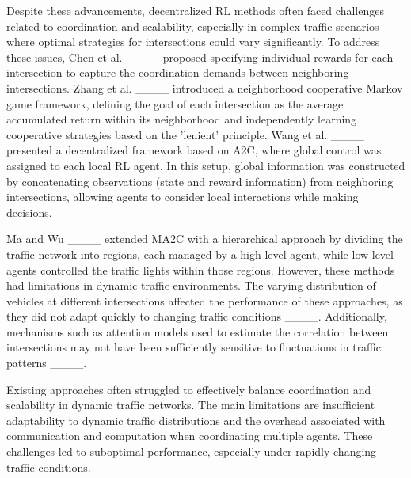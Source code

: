 Despite these advancements, decentralized RL methods often faced challenges related to coordination and scalability, especially in complex traffic scenarios where optimal strategies for intersections could vary significantly. To address these issues, Chen et al. ____ proposed specifying individual rewards for each intersection to capture the coordination demands between neighboring intersections. Zhang et al. ____ introduced a neighborhood cooperative Markov game framework, defining the goal of each intersection as the average accumulated return within its neighborhood and independently learning cooperative strategies based on the 'lenient' principle. Wang et al. ____ presented a decentralized framework based on A2C, where global control was assigned to each local RL agent. In this setup, global information was constructed by concatenating observations (state and reward information) from neighboring intersections, allowing agents to consider local interactions while making decisions.

Ma and Wu ____ extended MA2C with a hierarchical approach by dividing the traffic network into regions, each managed by a high-level agent, while low-level agents controlled the traffic lights within those regions. However, these methods had limitations in dynamic traffic environments. The varying distribution of vehicles at different intersections affected the performance of these approaches, as they did not adapt quickly to changing traffic conditions ____. Additionally, mechanisms such as attention models used to estimate the correlation between intersections may not have been sufficiently sensitive to fluctuations in traffic patterns ____.

Existing approaches often struggled to effectively balance coordination and scalability in dynamic traffic networks. The main limitations are insufficient adaptability to dynamic traffic distributions and the overhead associated with communication and computation when coordinating multiple agents. These challenges led to suboptimal performance, especially under rapidly changing traffic conditions.